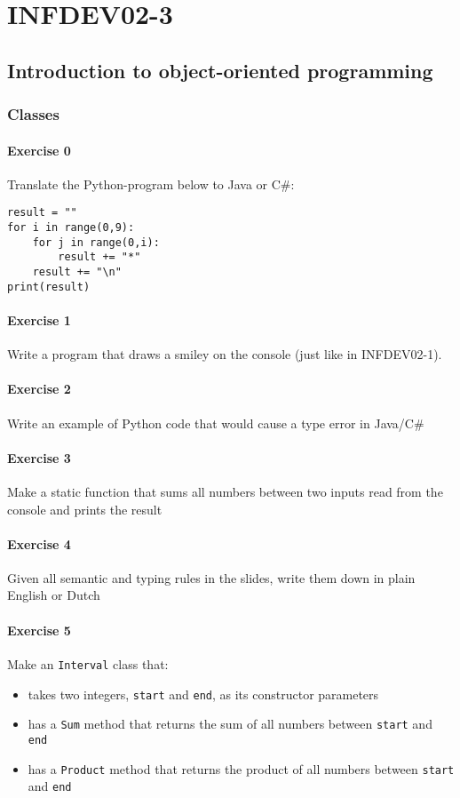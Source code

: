 \setcounter{part}{3}
\part{INFDEV02-3}
\setcounter{chapter}{0}
\chapter{Introduction to object-oriented programming}

    \section{Classes}
    
\subsection{Exercise 0}
            Translate the Python-program below to Java or C\#:
            \begin{lstlisting}
result = ""
for i in range(0,9):
    for j in range(0,i):
        result += "*"
    result += "\n"
print(result)
            \end{lstlisting}

\subsection{Exercise 1} Write a program that draws a smiley on the console (just like in INFDEV02-1).
\subsection{Exercise 2} Write an example of Python code that would cause a type error in Java/C\#
\subsection{Exercise 3} Make a static function that sums all numbers between two inputs read from the console and prints the result
\subsection{Exercise 4} Given all semantic and typing rules in the slides, write them down in plain English or Dutch
\subsection{Exercise 5} 
Make an \texttt{Interval} class that:
            \begin{itemize}
                \item takes two integers, \texttt{start} and \texttt{end}, as its constructor parameters
                \item has a \texttt{Sum} method that returns the sum of all numbers between \texttt{start} and \texttt{end}
                \item has a \texttt{Product} method that returns the product of all numbers between \texttt{start} and \texttt{end}
            \end{itemize}
